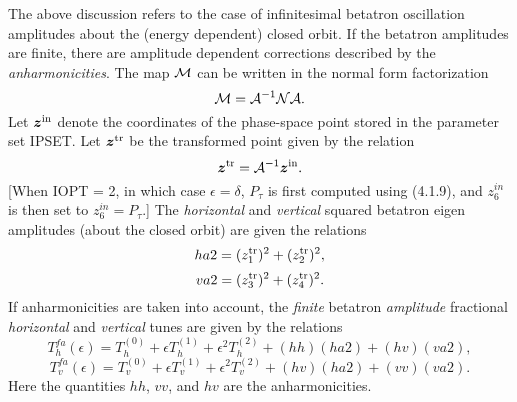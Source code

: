 The above discussion refers to the case of infinitesimal betatron oscillation amplitudes about the (energy dependent) closed orbit.  If the betatron amplitudes are finite, there are amplitude dependent corrections described by the {\em anharmonicities}.  The map ${\cal M}$ can be written in the normal form factorization
\begin{equation}
{\cal M} = {\cal A}^{-1} {\cal N} {\cal A}.
\end{equation}
Let $\mbox{\boldmath $z$}^{\rm in}$ denote the coordinates of the
phase-space point stored in the parameter set IPSET.  Let $\mbox{\boldmath
$z$}^{\rm tr}$ be the transformed point given by the relation
\begin{equation}
\mbox{\boldmath $z$}^{\rm tr} = {\cal A}^{-1} \mbox{\boldmath $z$}^{\rm in}.
\end{equation}
[When IOPT = 2, in which case $\epsilon = \delta$, $P_{\tau}$ is first
computed using (4.1.9), and $z^{in}_6$ is then set to $z^{in}_6 =
P_{\tau}$.]  The {\em horizontal} and {\em vertical} squared betatron
eigen amplitudes (about the closed orbit) are given the relations 
\begin{equation}
ha2 = (z^{\rm tr}_1)^2 + (z^{\rm tr}_2)^2,
\end{equation}
\begin{equation}
va2 = (z^{\rm tr}_3)^2 + (z^{\rm tr}_4)^2.
\end{equation}
If anharmonicities are taken into account, the {\em finite} betatron {\em
amplitude} fractional {\em horizontal} and {\em vertical} tunes are given by the
relations
\begin{equation}
T^{fa}_h(\epsilon) = T^{(0)}_h + \epsilon T^{(1)}_h + \epsilon^2
T^{(2)}_h + (hh) (ha2) + (hv)(va2),
\end{equation}
\begin{equation}
T^{fa}_v(\epsilon) = T^{(0)}_v + \epsilon T^{(1)}_v + \epsilon^2
T^{(2)}_v + (hv) (ha2) + (vv)(va2).
\end{equation}
Here the quantities $hh$, $vv$, and $hv$ are the anharmonicities.

